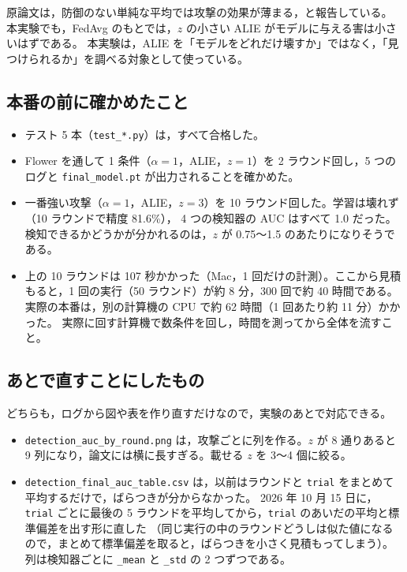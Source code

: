 \documentclass[a4j, dvipdfmx]{jsarticle}  %
\begin{document}
原論文は，防御のない単純な平均では攻撃の効果が薄まる，と報告している。
本実験でも，FedAvg のもとでは，$z$ の小さい ALIE がモデルに与える害は小さいはずである。
本実験は，ALIE を「モデルをどれだけ壊すか」ではなく，「見つけられるか」を調べる対象として使っている。

\subsection{本番の前に確かめたこと}

\begin{itemize}
  \item テスト 5 本（\texttt{test\_*.py}）は，すべて合格した。
  \item Flower を通して 1 条件（$\alpha = 1$，ALIE，$z = 1$）を 2 ラウンド回し，5 つのログと \texttt{final\_model.pt} が出力されることを確かめた。
  \item 一番強い攻撃（$\alpha = 1$，ALIE，$z = 3$）を 10 ラウンド回した。学習は壊れず（10 ラウンドで精度 81.6\%），
        4 つの検知器の AUC はすべて 1.0 だった。検知できるかどうかが分かれるのは，$z$ が 0.75〜1.5 のあたりになりそうである。
  \item 上の 10 ラウンドは 107 秒かかった（Mac，1 回だけの計測）。ここから見積もると，1 回の実行（50 ラウンド）が約 8 分，300 回で約 40 時間である。実際の本番は，別の計算機の CPU で約 62 時間（1 回あたり約 11 分）かかった。
        実際に回す計算機で数条件を回し，時間を測ってから全体を流すこと。
\end{itemize}

\subsection{あとで直すことにしたもの}

どちらも，ログから図や表を作り直すだけなので，実験のあとで対応できる。
\begin{itemize}
  \item \texttt{detection\_auc\_by\_round.png} は，攻撃ごとに列を作る。$z$ が 8 通りあると 9 列になり，論文には横に長すぎる。載せる $z$ を 3〜4 個に絞る。
  \item \texttt{detection\_final\_auc\_table.csv} は，以前はラウンドと \texttt{trial} をまとめて平均するだけで，ばらつきが分からなかった。
        2026 年 10 月 15 日に，\texttt{trial} ごとに最後の 5 ラウンドを平均してから，\texttt{trial} のあいだの平均と標準偏差を出す形に直した
        （同じ実行の中のラウンドどうしは似た値になるので，まとめて標準偏差を取ると，ばらつきを小さく見積もってしまう）。
        列は検知器ごとに \texttt{\_mean} と \texttt{\_std} の 2 つずつである。
\end{itemize}
\end{document}
